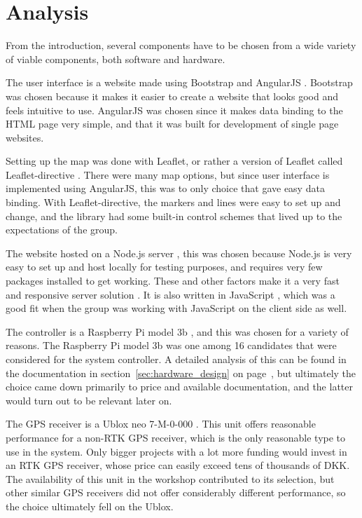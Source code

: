 \chapter{Analysis}

From the introduction, several components have to be chosen from a wide variety of viable components, both software and hardware.

The user interface is a website made using Bootstrap\cite{bootstrap} and AngularJS \cite{angular}. 
Bootstrap was chosen because it makes it easier to create a website that looks good and feels intuitive to use.
AngularJS was chosen since it makes data binding to the HTML page very simple, and that it was built for development of single page websites.

Setting up the map was done with Leaflet, or rather a version of Leaflet called Leaflet-directive \cite{leaflet}. There were many map options, but since user interface is implemented using AngularJS, this was to only choice that gave easy data binding. With Leaflet-directive, the markers and lines were easy to set up and change, and the library had some built-in control schemes that lived up to the expectations of the group.

The website hosted on a Node.js server \cite{nodejs}, this was chosen because Node.js is very easy to set up and host locally for testing purposes, and requires very few packages installed to get working. These and other factors make it a very fast and responsive server solution \cite{NodeJS_fast}. It is also written in JavaScript \cite{javascript}, which was a good fit when the group was working with JavaScript on the client side as well.

The controller is a Raspberry Pi model 3b \cite{rpi}, and this was chosen for a variety of reasons. The Raspberry Pi model 3b was one among 16 candidates that were considered for the system controller. A detailed analysis of this can be found in the documentation in section~\ref{sec:hardware_design} on page~\pageref{sec:hardware_design}, but ultimately the choice came down primarily to price and available documentation, and the latter would turn out to be relevant later on.

The GPS receiver is a Ublox neo 7-M-0-000 \cite{ublox-datasheet}. This unit offers reasonable performance for a non-RTK GPS receiver, which is the only reasonable type to use in the system. Only bigger projects with a lot more funding would invest in an RTK GPS receiver, whose price can easily exceed tens of thousands of DKK. The availability of this unit in the workshop contributed to its selection, but other similar GPS receivers did not offer considerably different performance, so the choice ultimately fell on the Ublox.

